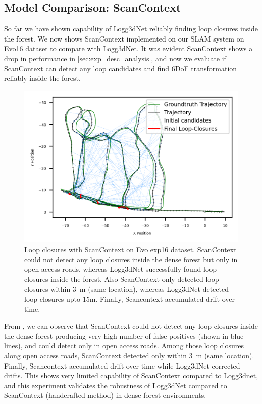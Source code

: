 \subsection*{Model Comparison: ScanContext}
So far we have shown capability of Logg3dNet reliably finding loop closures inside the forest. We now shows ScanContext implemented on our SLAM system on Evo16 dataset to compare with Logg3dNet. It was evident ScanContext shows a drop in performance in \ref{sec:exp_desc_analysis}, and now we evaluate if ScanContext can detect any loop candidates and find 6DoF transformation reliably inside the forest.  
\begin{figure}[htbp]
  \centering
  \includegraphics[width=0.75\columnwidth]{pics/exp_2_sc_loop_closure.png}
  \caption{Loop closures with ScanContext on Evo exp16 dataset. ScanContext could not detect any loop closures inside the dense forest but only in open access roads, whereas Logg3dNet successfully found loop closures inside the forest. Also ScanContext only detected loop closures within \SI{3}{\meter} (same location), whereas Logg3dNet detected loop closures upto 15m. Finally, Scancontext accumulated drift over time.}
  \label{fig:exp_2_3_loop_closure_comparison}
\end{figure}

From , we can observe that ScanContext could not detect any loop closures inside the dense forest producing very high number of false positives (shown in blue lines), and could detect only in open access roads. Among those loop closures along open access roads, ScanContext detected only within \SI{3}{\meter} (same location). Finally, Scancontext accumulated drift over time while Logg3dNet corrected drifts. This shows very limited capability of ScanContext compared to Logg3dnet, and this experiment validates the robustness of Logg3dNet compared to ScanContext (handcrafted method) in dense forest environments.




